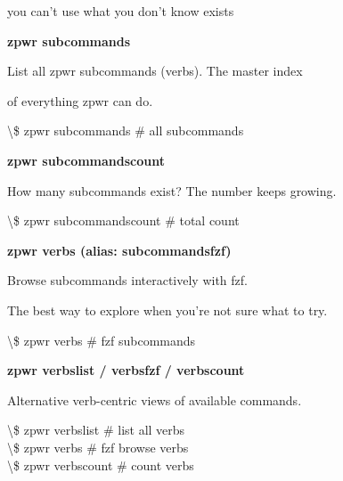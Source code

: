\documentclass[11pt,a4paper,twoside]{book}
\begin{document}
you can't use what you don't know exists


\vspace{12pt}
{\bfseries\color{neonyellow} zpwr subcommands}\vspace{4pt}

List all zpwr subcommands (verbs). The master index

of everything zpwr can do.

\begin{codebox}
\textbackslash{}\$ zpwr subcommands             \# all subcommands\\
\end{codebox}


\vspace{12pt}
{\bfseries\color{neonyellow} zpwr subcommandscount}\vspace{4pt}

How many subcommands exist? The number keeps growing.

\begin{codebox}
\textbackslash{}\$ zpwr subcommandscount        \# total count\\
\end{codebox}


\vspace{12pt}
{\bfseries\color{neonyellow} zpwr verbs (alias: subcommandsfzf)}\vspace{4pt}

Browse subcommands interactively with fzf.

The best way to explore when you're not sure what to try.

\begin{codebox}
\textbackslash{}\$ zpwr verbs         \# fzf subcommands\\
\end{codebox}


\vspace{12pt}
{\bfseries\color{neonyellow} zpwr verbslist / verbsfzf / verbscount}\vspace{4pt}

Alternative verb-centric views of available commands.

\begin{codebox}
\textbackslash{}\$ zpwr verbslist              \# list all verbs\\
\textbackslash{}\$ zpwr verbs               \# fzf browse verbs\\
\textbackslash{}\$ zpwr verbscount             \# count verbs\\
\end{codebox}
\end{document}
